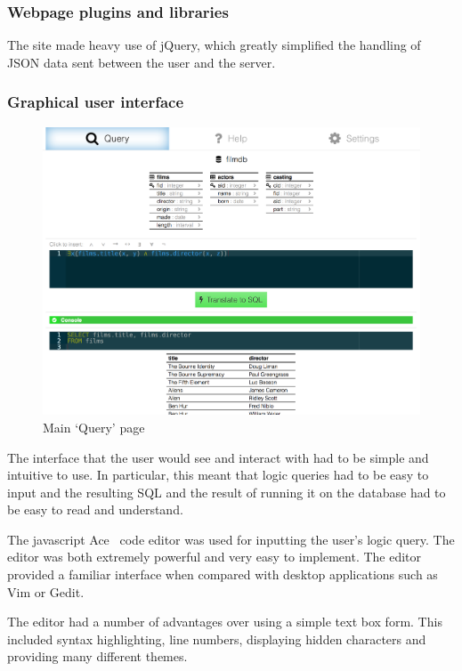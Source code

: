 \documentclass[a4paper, 11pt]{article}
\begin{document}
    \subsubsection{Webpage plugins and libraries}
      The site made heavy use of jQuery, which greatly simplified the handling
      of JSON data sent between the user and the server.

    \subsubsection{Graphical user interface}
      \begin{figure}[h!]
        \includegraphics[width=\textwidth]{images/site_query.png}
        \caption{Main `Query' page}
      \end{figure}

      The interface that the user would see and interact with had to be simple
      and intuitive to use. In particular, this meant that logic queries had to
      be easy to input and the resulting SQL and the result of running it on the
      database had to be easy to read and understand.

      The javascript Ace~\cite{aceEditor} code editor was used for inputting the
      user's logic query. The editor was both extremely powerful and very easy
      to implement. The editor provided a familiar interface when compared with
      desktop applications such as Vim or Gedit.

      The editor had a number of advantages over using a simple text box form.
      This included syntax highlighting, line numbers, displaying hidden
      characters and providing many different themes.
\end{document}
